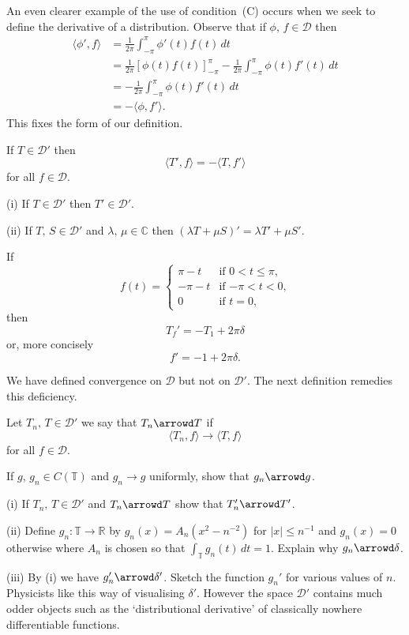 An even clearer example of the use of condition~(C) occurs
when we seek to define the derivative of a distribution.
Observe that if $\phi,\,f\in{\mathcal D}$ then
\begin{align*}
\langle \phi',f\rangle&
=\frac{1}{2\pi}\int_{-\pi}^{\pi}\phi'(t)f(t)\,dt\\
&=\frac{1}{2\pi}\left[\phi(t)f(t)\right]_{-\pi}^{\pi}
-\frac{1}{2\pi}\int_{-\pi}^{\pi}\phi(t)f'(t)\,dt\\
&=-\frac{1}{2\pi}\int_{-\pi}^{\pi}\phi(t)f'(t)\,dt\\
&=-\langle \phi,f'\rangle.
\end{align*}
This fixes the form of our definition.
\begin{definition} If $T\in{\mathcal D}'$ then
\[\langle T',f\rangle=-\langle T,f'\rangle\]
for all $f\in{\mathcal D}$.
\end{definition}
\begin{lemma} (i)
If $T\in{\mathcal D}'$ then $T'\in{\mathcal D}'$.

(ii) If $T,\,S\in{\mathcal D}'$ and $\lambda,\,\mu\in{\mathbb C}$
then $(\lambda T+\mu S)'=\lambda T'+\mu S'$.
\end{lemma}
\begin{exercise}
If
\begin{equation*}
f(t)=
\begin{cases}
\pi-t&\text{if $0<t\leq \pi$,}\\
-\pi-t&\text{if $-\pi<t<0$,}\\
0&\text{if $t=0$,}
\end{cases}
\end{equation*}
then
\[T_{f}'=-T_{1}+2\pi \delta\]
or, more concisely
\[f'=-1+2\pi \delta.\]
\end{exercise}

We have defined convergence on ${\mathcal D}$ but not on
${\mathcal D}'$. The next definition remedies this deficiency.
\begin{definition} Let $T_{n},\,T\in{\mathcal D}'$
we say that $T_{n}\arrowd T$ if
\[\langle T_{n},f\rangle\rightarrow \langle T,f\rangle\]
for all $f\in{\mathcal D}$.
\end{definition}
\begin{exercise} If $g,\,g_{n}\in C({\mathbb T})$ and
$g_{n}\rightarrow g$ uniformly, show that
$g_{n}\arrowd g$.
\end{exercise}
\begin{exercise} (i) If $T_{n},\,T\in{\mathcal D}'$
and $T_{n}\arrowd T$ show that $T_{n}'\arrowd T'$.

(ii) Define $g_{n}:{\mathbb T}\rightarrow{\mathbb R}$
by $g_{n}(x)=A_{n}(x^{2}-n^{-2})$ for $|x|\leq n^{-1}$
and $g_{n}(x)=0$ otherwise where $A_{n}$ is chosen so that
$\int_{\mathbb T}g_{n}(t)\,dt=1$. Explain why
$g_{n}\arrowd \delta$.

(iii) By (i) we have $g_{n}'\arrowd \delta'$.
Sketch the function $g_{n}'$ for various values of $n$.
Physicists like this way of visualising $\delta'$.
However the space ${\mathcal D}'$ contains much
odder objects such as the `distributional derivative'
of classically nowhere differentiable functions.
\end{exercise}

